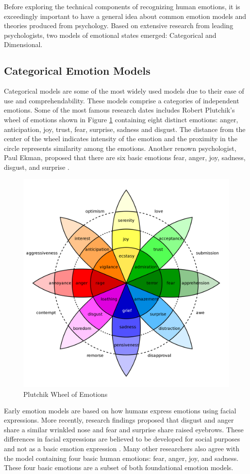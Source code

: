 Before exploring the technical components of recognizing human emotions, it is exceedingly important to have a general idea about common emotion models and theories produced from psychology. Based on extensive research from leading psychologists, two models of emotional states emerged: Categorical and Dimensional. 

\subsection{Categorical Emotion Models}
    Categorical models are some of the most widely used models due to their ease of use and comprehendability. These models comprise a categories of independent emotions. Some of the most famous research dates includes Robert Plutchik's \cite{plutchik-2001} wheel of emotions shown in Figure \ref{fig:plutchik-wheel} containing eight distinct emotions: anger, anticipation, joy, trust, fear, surprise, sadness and disgust. The distance from the center of the wheel indicates intensity of the emotion and the proximity in the circle represents similarity among the emotions. Another renown psychologist, Paul Ekman, proposed that there are six basic emotions fear, anger, joy, sadness, disgust, and surprise \cite{ekman-1992}. 
    
    \begin{figure}[!htb]
    \centering
    \includegraphics[width=.4\textwidth]{figures/Plutchik-wheel.png}
    \caption{\label{fig:plutchik-wheel} Plutchik Wheel of Emotions \cite{plutchik-2001}}
    \end{figure}
    
    Early emotion models are based on how humans express emotions using facial expressions. More recently, research findings proposed that disgust and anger share a similar wrinkled nose and fear and surprise share raised eyebrows\cite{jack-2014}. These differences in facial expressions are believed to be developed for social purposes and not as a basic emotion expression \cite{mansourian-2016}. Many other researchers \cite{gu-2016}\cite{gu-2019}\cite{zheng-2016} also agree with the model containing four basic human emotions: fear, anger, joy, and sadness. These four basic emotions are a subset of both foundational emotion models.

